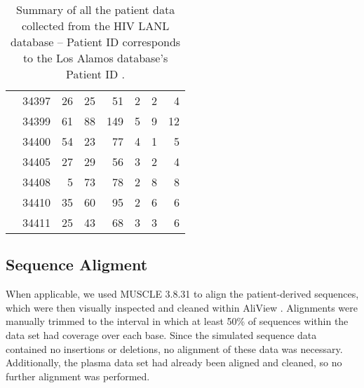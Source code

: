 \begin{table*}[!ht]
\begin{center}
\begin{tabular}{llrrrrrr}
& 34397 &      26 &       25 &       51 &        2 &        2 &        4  \\ 
& 34399 &      61 &       88 &      149 &        5 &        9 &       12  \\ 
& 34400 &      54 &       23 &       77 &        4 &        1 &        5  \\ 
& 34405 &      27 &       29 &       56 &        3 &        2 &        4  \\ 
& 34408 &       5 &       73 &       78 &        2 &        8 &        8 \\ 
& 34410 &      35 &       60 &       95 &        2 &        6 &        6 \\ 
& 34411 &      25 &       43 &       68 &        3 &        3 &        6   \\ \hline
\end{tabular}
\end{center}
  \caption{Summary of all the patient data collected from the HIV LANL database -- Patient ID corresponds to the Los Alamos database's Patient ID \citep{LosAlamos}.
   }\label{tab:patients} 
\end{table*}

\subsection * {Sequence Aligment} \label{subsec:seqalign}
When applicable, we used MUSCLE 3.8.31 \citep{Muscle04} to align the patient-derived sequences, which were then visually inspected and cleaned within AliView \citep{AliView14}. 
Alignments were manually trimmed to the interval in which at least  50\% of sequences within the data set had coverage over each base.
Since the simulated sequence data contained no insertions or deletions, no alignment of these data was necessary. 
Additionally, the plasma data set \citep{McCloskey14} had already been aligned and cleaned, so no further alignment was performed.


